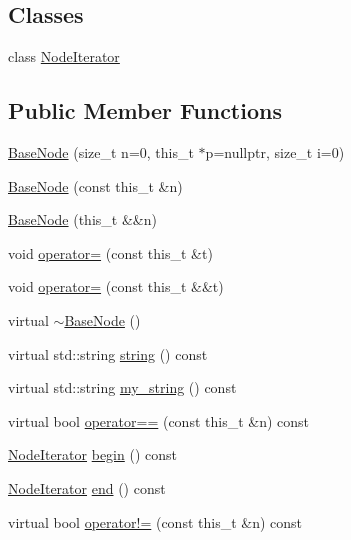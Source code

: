 \subsection*{Classes}
\begin{DoxyCompactItemize}
\item 
class \hyperlink{class_base_node_1_1_node_iterator}{Node\+Iterator}
\end{DoxyCompactItemize}
\subsection*{Public Member Functions}
\begin{DoxyCompactItemize}
\item 
\hyperlink{class_base_node_ae6af9c22d332e9c3158d9467f77b59f7}{Base\+Node} (size\+\_\+t n=0, this\+\_\+t $\ast$p=nullptr, size\+\_\+t i=0)
\item 
\hyperlink{class_base_node_a4bad5d46ee19af54c1385771bb6c8380}{Base\+Node} (const this\+\_\+t \&n)
\item 
\hyperlink{class_base_node_ab42ef3f5a20566523577925ab0c2a911}{Base\+Node} (this\+\_\+t \&\&n)
\item 
void \hyperlink{class_base_node_a1a82f7670d09cdd2a7f12e00513b1d8f}{operator=} (const this\+\_\+t \&t)
\item 
void \hyperlink{class_base_node_adc129f52a6d44237b7e8c62c65f8332c}{operator=} (const this\+\_\+t \&\&t)
\item 
virtual \hyperlink{class_base_node_a2a33248b0eb051d7672691a73a38ff12}{$\sim$\+Base\+Node} ()
\item 
virtual std\+::string \hyperlink{class_base_node_ac26bf9f89abeaca8d43b73f2d8d1d9cf}{string} () const
\item 
virtual std\+::string \hyperlink{class_base_node_a263b93d5aaf1ce5eb7f103bf3b988db3}{my\+\_\+string} () const
\item 
virtual bool \hyperlink{class_base_node_a33bb5c59122f6b2778d39a0eaa0151d7}{operator==} (const this\+\_\+t \&n) const
\item 
\hyperlink{class_base_node_1_1_node_iterator}{Node\+Iterator} \hyperlink{class_base_node_ac735dd6fe296af4b8d2951cc6d9052c8}{begin} () const
\item 
\hyperlink{class_base_node_1_1_node_iterator}{Node\+Iterator} \hyperlink{class_base_node_a990f4bbfab3e8c78421e51f32cb5db48}{end} () const
\item 
virtual bool \hyperlink{class_base_node_a2f0418334eb790283f8074c9a27fed6e}{operator!=} (const this\+\_\+t \&n) const

\end{DoxyCompactItemize}
